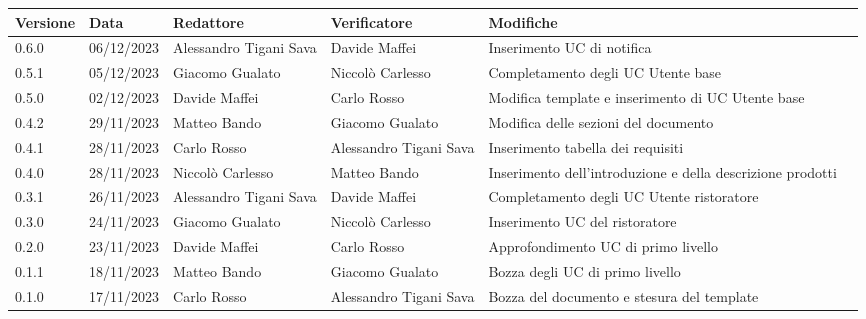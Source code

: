 \begin{table}[H]
	\centering
	\fontsize{10}{12}\selectfont
	\begin{tabularx}{\textwidth}{X|X|X|X|X|X}
		\textbf{Versione}     & \textbf{Data}        & \textbf{Redattore}     &
		\textbf{Verificatore}  & \textbf{Modifiche}                                                                                                    \\
		\toprule
		0.6.0                 & 06/12/2023           & Alessandro Tigani Sava & Davide Maffei                     & Inserimento UC di notifica                                 \\
		\hline
		0.5.1                 & 05/12/2023           & Giacomo Gualato        & Niccolò Carlesso                    & Completamento degli UC Utente base                         \\
		\hline
		0.5.0                 & 02/12/2023           & Davide Maffei          & Carlo Rosso                & Modifica template e inserimento di UC Utente base          \\
		\hline
		0.4.2                 & 29/11/2023           & Matteo Bando           & Giacomo Gualato                  & Modifica delle sezioni del documento                \\
		\hline
		0.4.1                 & 28/11/2023           & Carlo Rosso            & Alessandro Tigani Sava           & Inserimento tabella dei requisiti                          \\
		\hline
		0.4.0                 & 28/11/2023           & Niccolò Carlesso       & Matteo Bando           & Inserimento dell'introduzione e della descrizione prodotti \\
		\hline
		0.3.1                 & 26/11/2023           & Alessandro Tigani Sava & Davide Maffei                     & Completamento degli UC Utente ristoratore                  \\
		\hline
		0.3.0                 & 24/11/2023           & Giacomo Gualato        & Niccolò Carlesso                   & Inserimento UC del ristoratore             \\
		\hline
		0.2.0                 & 23/11/2023           & Davide Maffei          & Carlo Rosso         		 & Approfondimento UC di primo livello        \\
		\hline
		0.1.1                 & 18/11/2023           & Matteo Bando           & Giacomo Gualato                & Bozza degli UC di primo livello            \\
		\hline
		0.1.0                 & 17/11/2023           & Carlo Rosso            & Alessandro Tigani Sava         & Bozza del documento e stesura del template \\
		\bottomrule
	\end{tabularx}
\end{table}